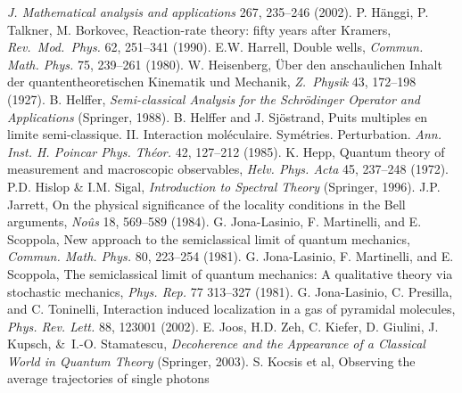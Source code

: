 \documentclass[12pt]{article}
\begin{document}
\begin{thebibliography}{99}
\begin{footnotesize}
\emph{J. Mathematical analysis and applications} 267, 235--246  (2002). 
 P. H\"{a}nggi, P. Talkner, M. Borkovec, Reaction-rate theory: fifty years after Kramers,
\emph{Rev.\ Mod.\ Phys.} 62, 251--341 (1990).
 E.W. Harrell, Double wells, \emph{Commun. Math. Phys.} 75, 239--261 (1980). 
  W. Heisenberg, \"{U}ber den anschaulichen Inhalt der quantentheoretischen Kinematik und Mechanik, \emph{Z.\ Physik} 43, 172--198 (1927).
 B. Helffer, {\it Semi-classical Analysis for the Schr\"{o}dinger Operator and Applications} (Springer, 1988). 
 B. Helffer and J. Sj\"{o}strand,  Puits multiples en limite semi-classique. II. Interaction mol\'{e}culaire. Sym\'{e}tries. Perturbation.
\emph{ Ann. Inst. H. Poincar Phys. Th\'{e}or.} 42, 127--212 (1985).
 K. Hepp, Quantum theory of measurement and macroscopic observables,
  \emph{Helv. Phys. Acta}  45, 237--248 (1972). 
  P.D. Hislop \& I.M. Sigal, {\it Introduction to Spectral Theory}
(Springer,  1996).
 J.P. Jarrett, On the physical significance of the locality conditions in the Bell arguments,
\emph{No\^{u}s} 18, 569--589 (1984).
 G. Jona-Lasinio, F. Martinelli, and E. Scoppola, New approach to the semiclassical limit of quantum mechanics,
\emph{Commun. Math. Phys.} 80, 223--254 (1981).
 G. Jona-Lasinio, F. Martinelli, and E. Scoppola, The semiclassical limit of quantum mechanics: A qualitative theory via stochastic mechanics,  \emph{Phys. Rep.} 77 313--327 (1981).
  G. Jona-Lasinio, C. Presilla, and C. Toninelli, Interaction induced localization in a gas of pyramidal molecules,
\emph{ Phys. Rev. Lett.}  88, 123001 (2002).
 E. Joos,   H.D. Zeh, C. Kiefer, D.  Giulini, J.  Kupsch, \&\ I.-O. Stamatescu,  
{\it Decoherence and the Appearance of a Classical World in Quantum Theory} (Springer, 2003).
 S. Kocsis et al, Observing the average
trajectories of single photons

\end{footnotesize}
\end{thebibliography}
\end{document}
